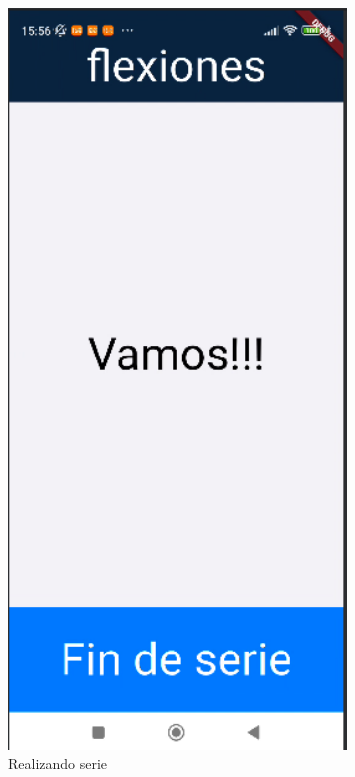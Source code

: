 \begin{figure}[H]
   \centering
    \includegraphics[width=0.8\textwidth]{pantallas/entrenando.png}
    \caption{Realizando serie}
    \label{fig:entrenando}
\end{figure}

